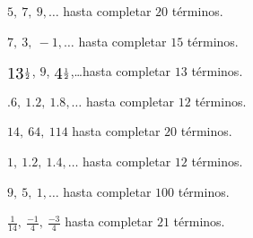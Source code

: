 \documentclass[12pt,addpoints,x11names]{exam}
\begin{document}
\begin{questions}
\begin{multicols}{2}

\question $5,\ 7,\ 9,\ldots$ hasta completar $20$ términos.

\question $7,\ 3,\ -1,\ldots$ hasta completar $15$ términos.

\question $\scalerel{13}{\scriptstyle\frac{1}{2}}$, $9$,
$\scalerel{4}{\scriptstyle\frac{1}{2}}$,\ldots hasta completar $13$ términos.

\question $.6,\ 1.2,\ 1.8,\ldots$ hasta completar $12$ términos.




\question $14,\ 64,\ 114$ hasta completar $20$ términos.

\question $1,\ 1.2,\ 1.4,\ldots$ hasta completar $12$ términos.

\question $9,\ 5,\ 1,\ldots$ hasta completar $100$ términos.

\question $\frac{1}{14},\ \frac{-1}{4},\ \frac{-3}{4}$ hasta completar $21$ términos.

\end{multicols}

\end{questions}
\end{document}
